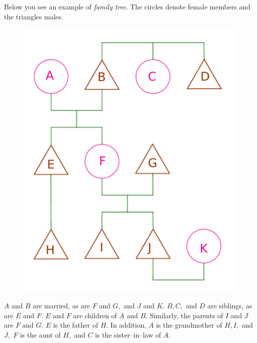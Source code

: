 \begin{multicols}{2}
	Below you see an example of \textit{family tree}.
	The circles denote female members and the triangles males.
	\begin{figure}[H]
		\vspace*{-5pt}
		\centering
		\captionsetup{labelformat= empty, justification=centering}
		\includegraphics[width= 0.75\linewidth]{hc-2022-2-3-15-1.pdf}
		\vspace*{-10pt}
	\end{figure}
	$A$ and $B$ are married, as are $F$ and $G,$ and $J$ and $K.$
	\vskip 0.1cm
	$B, C,$ and $D$ are siblings, as are $E$ and $F.$
	$E$ and $F$ are children of $A$ and $B.$
	\vskip 0.1cm
	Similarly, the parents of $I$ and $J$ are $F$ and $G.$
	$E$ is the father of $H.$
	\vskip 0.1cm
	In addition, $A$ is the grandmother of $H, I,$ and $J,$
	$F$ is the aunt of $H,$ and $C$ is the sister--in--law of $A.$
	\begin{figure}[H]
		\vspace*{-5pt}
		\centering
		\captionsetup{labelformat= empty, justification=centering}

\end{figure}
\end{multicols}
